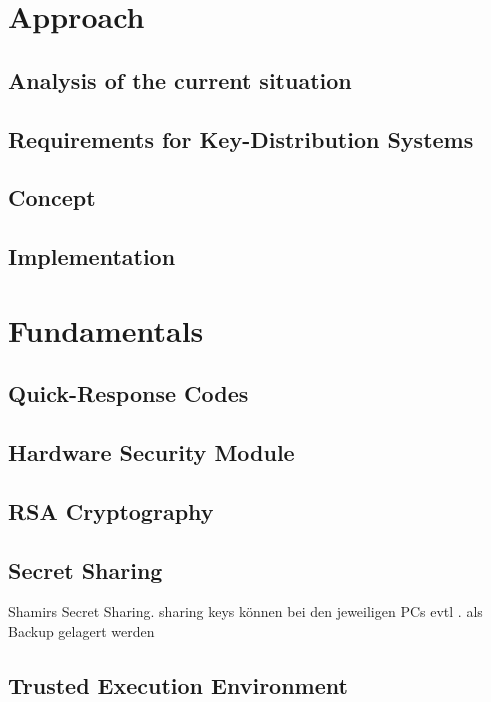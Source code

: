 \documentclass[12pt,twoside,a4paper,parskip]{scrbook}
\begin{document}
\chapter{Approach}

\section{Analysis of the current situation}

\section{Requirements for Key-Distribution Systems}

\section{Concept}

\section{Implementation}

\chapter{Fundamentals}

\section{Quick-Response Codes}

\section{Hardware Security Module}

\section{RSA Cryptography}

\section{Secret Sharing}

Shamirs Secret Sharing. sharing keys können bei den jeweiligen PCs evtl . als Backup gelagert werden

\section{Trusted Execution Environment}
\end{document}
